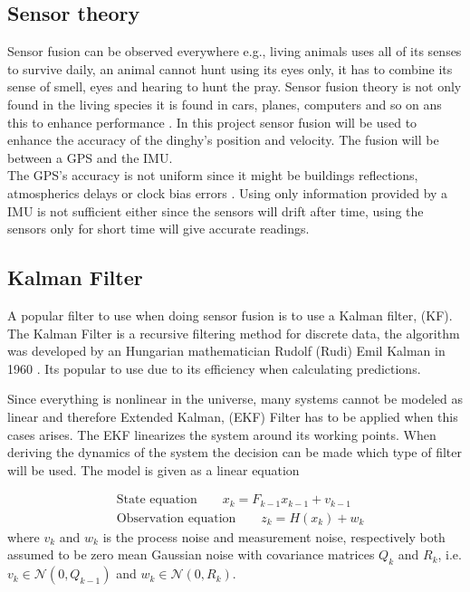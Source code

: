 \subsection*{Sensor theory}
Sensor fusion can be observed everywhere e.g., living animals uses all of its senses to survive daily, an animal cannot hunt using its eyes only, it has to combine its sense of smell, eyes and hearing to hunt the pray\cite{animal}. Sensor fusion theory is not only found in the living species it is found in cars, planes, computers and so on ans this to enhance performance \cite{animal}. In this project sensor fusion will be used to enhance the accuracy of the dinghy's position and velocity. The fusion will be between a GPS and the IMU.\\ 
The GPS's accuracy is not uniform since it might be buildings reflections, atmospherics delays or clock bias errors \cite{boken}. Using only information provided by a IMU is not sufficient either since the sensors will drift after time, using the sensors only for short time will give accurate readings.  


\subsection{Kalman Filter}
A popular filter to use when doing sensor fusion is to use a Kalman filter, (KF). The Kalman Filter is a recursive filtering method for discrete data, the algorithm was developed by an Hungarian mathematician Rudolf (Rudi) Emil Kalman in 1960 \cite{boken}. Its popular to use due to its efficiency when calculating predictions. \cite{kf eff}


Since everything is nonlinear in the universe, many systems cannot be modeled as linear \cite{nonlinear} and therefore Extended Kalman, (EKF) Filter has to be applied when this cases arises. The EKF linearizes the system around its working points. When deriving the dynamics of the system the decision can be made which type of filter will be used. The model is given as a linear equation

\begin{align}
&\textrm{State equation} \qquad x_k=F_{k-1}x_{k-1}+v_{k-1}\\
& \textrm{Observation equation} \qquad z_k=H(x_k)+w_k
\end{align}
where $v_k$ and $w_k$ is the process noise and measurement noise, respectively both assumed to be zero mean Gaussian noise with covariance matrices $Q_k$ and $R_k$, i.e. $v_k\in\mathcal{N}(0, Q_{k-1})$ and $w_k\in\mathcal{N}(0, R_k)$.

